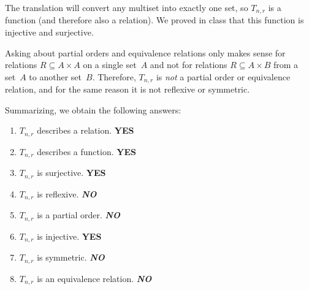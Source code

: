 \documentclass{jn-pset}
\begin{document}
\begin{problem}
\begin{subproblem}
  \end{subproblem}

\begin{solution}
  The translation will convert any multiset into exactly one set, so
  $T_{n,r}$ is a function (and therefore also a relation).
  We proved in class that this function is injective and surjective.

  Asking about partial orders
  and equivalence relations only makes sense for relations
  $R \subseteq A \times A$
  on a single set~$A$
  and not for relations
  $R \subseteq A \times B$
  from a set~$A$ to another set~$B$.
  Therefore,   
  $T_{n,r}$ is
  \emph{not}
  a partial order or equivalence relation, and
  for the same reason it is not reflexive or symmetric.

  Summarizing, we obtain the following answers:
    \begin{enumerate}  %
    \item
      $T_{n,r}$ describes a relation. \textbf{YES}
      
    \item
      $T_{n,r}$ describes a function. \textbf{YES}
      
    \item
      $T_{n,r}$ is surjective. \textbf{YES}
      
    \item
      $T_{n,r}$ is reflexive. \textbf{\textit{NO}}
  
    \item
      $T_{n,r}$ is a partial order. \textbf{\textit{NO}}
      
    \item
      $T_{n,r}$ is injective. \textbf{YES}
      
    \item
      $T_{n,r}$ is symmetric. \textbf{\textit{NO}}
      
    \item
      $T_{n,r}$ is an equivalence relation. \textbf{\textit{NO}}
      
    \end{enumerate}
  
  
\end{solution}

\end{problem}



%   
\end{document}
